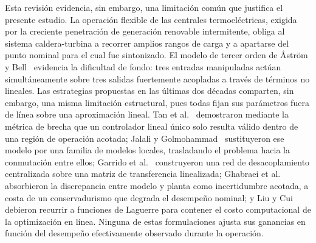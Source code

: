 \documentclass[final,5p,times,twocolumn,authoryear,11pt]{elsarticle}
\begin{document}
Esta revisión evidencia, sin embargo, una limitación común que justifica el presente estudio. La operación flexible de las centrales termoeléctricas, exigida por la creciente penetración de generación renovable intermitente, obliga al sistema caldera-turbina a recorrer amplios rangos de carga y a apartarse del punto nominal para el cual fue sintonizado. El modelo de tercer orden de Åström y Bell~\citep{astrom2000drum} evidencia la dificultad de fondo: tres entradas manipuladas actúan simultáneamente sobre tres salidas fuertemente acopladas a través de términos no lineales. Las estrategias propuestas en las últimas dos décadas comparten, sin embargo, una misma limitación estructural, pues todas fijan sus parámetros fuera de línea sobre una aproximación lineal. Tan et al.~\citep{tan2005analysis} demostraron mediante la métrica de brecha que un controlador lineal único solo resulta válido dentro de una región de operación acotada; Jalali y Golmohammad~\citep{jalali2012multiple} sustituyeron ese modelo por una familia de modelos locales, trasladando el problema hacia la conmutación entre ellos; Garrido et al.~\citep{garrido2009centralized} construyeron una red de desacoplamiento centralizada sobre una matriz de transferencia linealizada; Ghabraei et al.~\citep{ghabraei2020multivariable} absorbieron la discrepancia entre modelo y planta como incertidumbre acotada, a costa de un conservadurismo que degrada el desempeño nominal; y Liu y Cui~\citep{liu2018economic} debieron recurrir a funciones de Laguerre para contener el costo computacional de la optimización en línea. Ninguna de estas formulaciones ajusta sus ganancias en función del desempeño efectivamente observado durante la operación.
\end{document}
